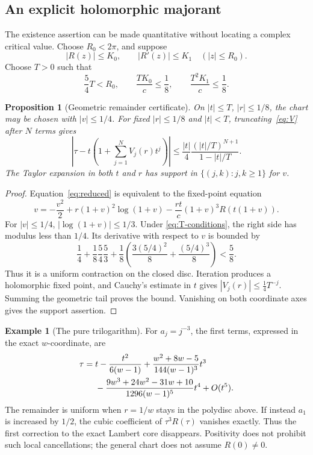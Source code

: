 \documentclass[11pt,a4paper]{article}
\numberwithin{equation}{section}
\newtheorem{proposition}[theorem]{Proposition}
\theoremstyle{definition}
\newtheorem{example}[theorem]{Example}
\theoremstyle{remark}
\begin{document}
\subsection{An explicit holomorphic majorant}
The existence assertion can be made quantitative without locating a complex
critical value. Choose \(R_0<2\pi\), and suppose
\[
 |R(z)|\le K_0,\qquad |R'(z)|\le K_1\quad(|z|\le R_0).
\]
Choose \(T>0\) such that
\begin{equation}
 \frac54T<R_0,\qquad \frac{TK_0}{c}\le\frac18,
 \qquad \frac{T^2K_1}{c}\le\frac18.
 \label{eq:T-conditions}
\end{equation}

\begin{proposition}[Geometric remainder certificate]
\label{prop:chart-bound}
On \(|t|\le T\), \(|r|\le1/8\), the chart may be chosen with \(|v|\le1/4\).
For fixed \(|r|\le1/8\) and \(|t|<T\), truncating~\eqref{eq:V} after \(N\)
terms gives
\begin{equation}
 \left|\tau-t\left(1+\sum_{j=1}^N V_j(r)t^j\right)\right|
 \le \frac{|t|}{4}\frac{(|t|/T)^{N+1}}{1-|t|/T}.
 \label{eq:chart-tail}
\end{equation}
The Taylor expansion in both \(t\) and \(r\) has support in
\(\{(j,k):j,k\ge1\}\) for \(v\).
\end{proposition}
\begin{proof}
Equation~\eqref{eq:reduced} is equivalent to the fixed-point equation
\[
 v=-\frac{v^2}{2}+r(1+v)^2\log(1+v)
   -\frac{rt}{c}(1+v)^3R(t(1+v)).
\]
For \(|v|\le1/4\), \(|\log(1+v)|\le1/3\). Under
\eqref{eq:T-conditions}, the right side has modulus less than \(1/4\).
Its derivative with respect to \(v\) is bounded by
\[
 \frac14+\frac18\frac54\frac53
 +\frac18\left(\frac{3(5/4)^2}{8}+\frac{(5/4)^3}{8}\right)
 <\frac58.
\]
Thus it is a uniform contraction on the closed disc. Iteration produces a
holomorphic fixed point, and Cauchy's estimate in \(t\) gives
\(|V_j(r)|\le\tfrac14T^{-j}\). Summing the geometric tail proves the bound.
Vanishing on both coordinate axes gives the support assertion.
\end{proof}

\begin{example}[The pure trilogarithm]
For \(a_j=j^{-3}\), the first terms, expressed in the exact \(w\)-coordinate,
are
\begin{align}
 \tau={}&t-\frac{t^2}{6(w-1)}
 +\frac{w^2+8w-5}{144(w-1)^3}t^3\notag\\
 &-\frac{9w^3+24w^2-31w+10}{1296(w-1)^5}t^4+O(t^5).
 \label{eq:pure-inverse}
\end{align}
The remainder is uniform when \(r=1/w\) stays in the polydisc above.
If instead \(a_1\) is increased by \(1/2\), the cubic coefficient of
\(\tau^3R(\tau)\) vanishes exactly. Thus the first correction to the exact
Lambert core disappears. Positivity does not prohibit such local
cancellations; the general chart does not assume \(R(0)\ne0\).
\end{example}
\end{document}
